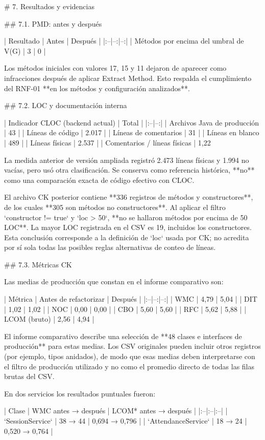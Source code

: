 # 7. Resultados y evidencias

## 7.1. PMD: antes y después

| Resultado | Antes | Después |
|:--|--:|--:|
| Métodos por encima del umbral de V(G) | 3 | 0 |

Los métodos iniciales con valores 17, 15 y 11 dejaron de aparecer como infracciones después de aplicar Extract Method. Esto respalda el cumplimiento del RNF-01 **en los métodos y configuración analizados**.

## 7.2. LOC y documentación interna

| Indicador CLOC (backend actual) | Total |
|:--|--:|
| Archivos Java de producción | 43 |
| Líneas de código | 2.017 |
| Líneas de comentarios | 31 |
| Líneas en blanco | 489 |
| Líneas físicas | 2.537 |
| Comentarios / líneas físicas | 1,22 %

La medida anterior de versión ampliada registró 2.473 líneas físicas y 1.994 no vacías, pero usó otra clasificación. Se conserva como referencia histórica, **no** como una comparación exacta de código efectivo con CLOC.

El archivo CK posterior contiene **336 registros de métodos y constructores**, de los cuales **305 son métodos no constructores**. Al aplicar el filtro `constructor != true` y `loc > 50`, **no se hallaron métodos por encima de 50 LOC**. La mayor LOC registrada en el CSV es 19, incluidos los constructores. Esta conclusión corresponde a la definición de `loc` usada por CK; no acredita por sí sola todas las posibles reglas alternativas de conteo de líneas.

## 7.3. Métricas CK

Las medias de producción que constan en el informe comparativo son:

| Métrica | Antes de refactorizar | Después |
|:--|--:|--:|
| WMC | 4,79 | 5,04 |
| DIT | 1,02 | 1,02 |
| NOC | 0,00 | 0,00 |
| CBO | 5,60 | 5,60 |
| RFC | 5,62 | 5,88 |
| LCOM (bruto) | 2,56 | 4,94 |

El informe comparativo describe una selección de **48 clases e interfaces de producción** para estas medias. Los CSV originales pueden incluir otros registros (por ejemplo, tipos anidados), de modo que esas medias deben interpretarse con el filtro de producción utilizado y no como el promedio directo de todas las filas brutas del CSV.

En dos servicios los resultados puntuales fueron:

| Clase | WMC antes → después | LCOM* antes → después |
|:--|:--|:--|
| `SessionService` | 38 → 44 | 0,694 → 0,796 |
| `AttendanceService` | 18 → 24 | 0,520 → 0,764 |

